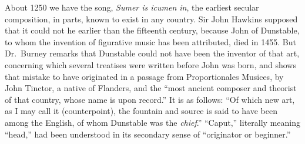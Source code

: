 About 1250 we have the song, \textit{Sumer is icumen in}, the earliest secular composition, 
in parts, known to exist in any country. Sir John Hawkins supposed that
it could not he earlier than the fifteenth century, because John of Dunstable, to
whom the invention of figurative music has been attributed, died in 1455. But
Dr.~Burney remarks that Dunstable could not have been the inventor of that art,
concerning which several treatises were written before John was born, and shows
that mistake to have originated in a passage from Proportionales Musices, by John
Tinctor, a native of Flanders, and the “most ancient composer and theorist of
that country, whose name is upon record.” It is as follows: “Of which new art,
as I may call it (counterpoint), the fountain and source is said to have been among
the English, of whom Dunstable was the \textit{chief}.” %
“Caput,” literally meaning
“head,” had been understood in its secondary sense of “originator or beginner.”

